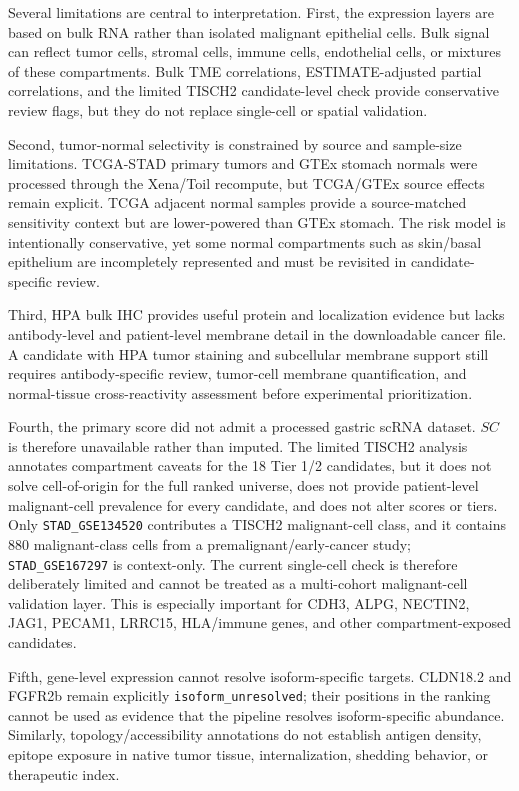 \documentclass[twocolumn]{article}
\begin{document}
Several limitations are central to interpretation. First, the expression layers are based on bulk RNA rather than isolated malignant epithelial cells. Bulk signal can reflect tumor cells, stromal cells, immune cells, endothelial cells, or mixtures of these compartments. Bulk TME correlations, ESTIMATE-adjusted partial correlations, and the limited TISCH2 candidate-level check provide conservative review flags, but they do not replace single-cell or spatial validation.

Second, tumor-normal selectivity is constrained by source and sample-size limitations. TCGA-STAD primary tumors and GTEx stomach normals were processed through the Xena/\allowbreak{}Toil recompute, but TCGA/\allowbreak{}GTEx source effects remain explicit. TCGA adjacent normal samples provide a source-matched sensitivity context but are lower-powered than GTEx stomach. The risk model is intentionally conservative, yet some normal compartments such as skin/\allowbreak{}basal epithelium are incompletely represented and must be revisited in candidate-specific review.

Third, HPA bulk IHC provides useful protein and localization evidence but lacks antibody-level and patient-level membrane detail in the downloadable cancer file. A candidate with HPA tumor staining and subcellular membrane support still requires antibody-specific review, tumor-cell membrane quantification, and normal-tissue cross-reactivity assessment before experimental prioritization.

Fourth, the primary score did not admit a processed gastric scRNA dataset. $SC$ is therefore unavailable rather than imputed. The limited TISCH2 analysis annotates compartment caveats for the 18 Tier 1/\allowbreak{}2 candidates, but it does not solve cell-of-origin for the full ranked universe, does not provide patient-level malignant-cell prevalence for every candidate, and does not alter scores or tiers. Only \texttt{STAD\_GSE134520} contributes a TISCH2 malignant-cell class, and it contains 880 malignant-class cells from a premalignant/\allowbreak{}early-cancer study; \texttt{STAD\_GSE167297} is context-only. The current single-cell check is therefore deliberately limited and cannot be treated as a multi-cohort malignant-cell validation layer. This is especially important for CDH3, ALPG, NECTIN2, JAG1, PECAM1, LRRC15, HLA/\allowbreak{}immune genes, and other compartment-exposed candidates.

Fifth, gene-level expression cannot resolve isoform-specific targets. CLDN18.2 and FGFR2b remain explicitly \texttt{isoform\_unresolved}; their positions in the ranking cannot be used as evidence that the pipeline resolves isoform-specific abundance. Similarly, topology/\allowbreak{}accessibility annotations do not establish antigen density, epitope exposure in native tumor tissue, internalization, shedding behavior, or therapeutic index.
\end{document}
